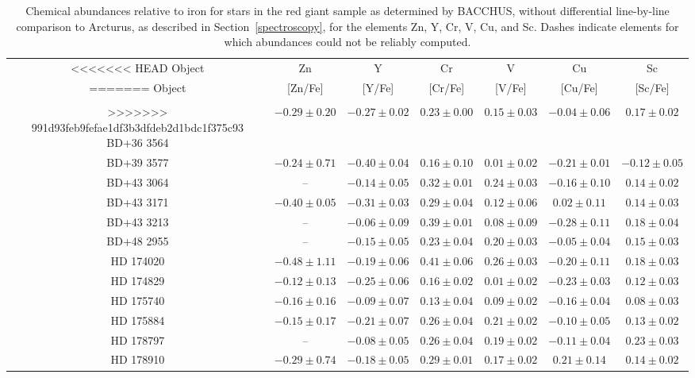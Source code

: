 \begin{table*}
\caption{Chemical abundances relative to iron for stars in the red giant sample as determined by BACCHUS, without differential line-by-line comparison to Arcturus, as described in Section~\ref{spectroscopy}, for the elements Zn, Y, Cr, V, Cu, and Sc. Dashes indicate elements for which abundances could not be reliably computed.\label{elems3}}
\begin{tabular}{ccccccc}
\hline \hline
<<<<<<< HEAD
Object & Zn & Y & Cr & V & Cu & Sc \\
=======
Object & [Zn/Fe] & [Y/Fe] & [Cr/Fe] & [V/Fe] & [Cu/Fe] & [Sc/Fe] \\
 &  &  &  &  &  &  \\
>>>>>>> 991d93feb9fefae1df3b3dfdeb2d1bdc1f375c93
\hline
BD+36 3564 & $-0.29 \pm 0.20$ & $-0.27 \pm 0.02$ & $0.23 \pm 0.00$ & $0.15 \pm 0.03$ & $-0.04 \pm 0.06$ & $0.17 \pm 0.02$ \\
BD+39 3577 & $-0.24 \pm 0.71$ & $-0.40 \pm 0.04$ & $0.16 \pm 0.10$ & $0.01 \pm 0.02$ & $-0.21 \pm 0.01$ & $-0.12 \pm 0.05$ \\
BD+43 3064 & -- & $-0.14 \pm 0.05$ & $0.32 \pm 0.01$ & $0.24 \pm 0.03$ & $-0.16 \pm 0.10$ & $0.14 \pm 0.02$ \\
BD+43 3171 & $-0.40 \pm 0.05$ & $-0.31 \pm 0.03$ & $0.29 \pm 0.04$ & $0.12 \pm 0.06$ & $0.02 \pm 0.11$ & $0.14 \pm 0.03$ \\
BD+43 3213 & -- & $-0.06 \pm 0.09$ & $0.39 \pm 0.01$ & $0.08 \pm 0.09$ & $-0.28 \pm 0.11$ & $0.18 \pm 0.04$ \\
BD+48 2955 & -- & $-0.15 \pm 0.05$ & $0.23 \pm 0.04$ & $0.20 \pm 0.03$ & $-0.05 \pm 0.04$ & $0.15 \pm 0.03$ \\
HD 174020 & $-0.48 \pm 1.11$ & $-0.19 \pm 0.06$ & $0.41 \pm 0.06$ & $0.26 \pm 0.03$ & $-0.20 \pm 0.11$ & $0.18 \pm 0.03$ \\
HD 174829 & $-0.12 \pm 0.13$ & $-0.25 \pm 0.06$ & $0.16 \pm 0.02$ & $0.01 \pm 0.02$ & $-0.23 \pm 0.03$ & $0.12 \pm 0.03$ \\
HD 175740 & $-0.16 \pm 0.16$ & $-0.09 \pm 0.07$ & $0.13 \pm 0.04$ & $0.09 \pm 0.02$ & $-0.16 \pm 0.04$ & $0.08 \pm 0.03$ \\
HD 175884 & $-0.15 \pm 0.17$ & $-0.21 \pm 0.07$ & $0.26 \pm 0.04$ & $0.21 \pm 0.02$ & $-0.10 \pm 0.05$ & $0.13 \pm 0.02$ \\
HD 178797 & -- & $-0.08 \pm 0.05$ & $0.26 \pm 0.04$ & $0.19 \pm 0.02$ & $-0.11 \pm 0.04$ & $0.23 \pm 0.03$ \\
HD 178910 & $-0.29 \pm 0.74$ & $-0.18 \pm 0.05$ & $0.29 \pm 0.01$ & $0.17 \pm 0.02$ & $0.21 \pm 0.14$ & $0.14 \pm 0.02$ \\

\end{tabular}
\end{table*}
